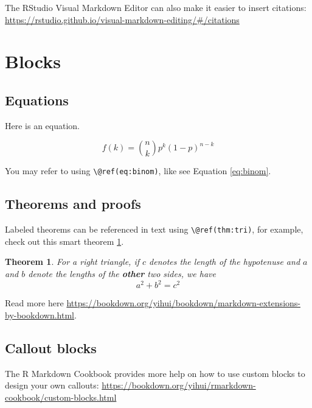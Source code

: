 \documentclass[
]{book}
\newtheorem{theorem}{Theorem}[chapter]
\theoremstyle{definition}
\theoremstyle{definition}
\theoremstyle{definition}
\theoremstyle{definition}
\theoremstyle{remark}
\begin{document}
The RStudio Visual Markdown Editor can also make it easier to insert citations: \url{https://rstudio.github.io/visual-markdown-editing/\#/citations}

\hypertarget{blocks}{%
\section{Blocks}\label{blocks}}

\hypertarget{equations}{%
\subsection{Equations}\label{equations}}

Here is an equation.

\begin{equation} 
  f\left(k\right) = \binom{n}{k} p^k\left(1-p\right)^{n-k}
  \label{eq:binom}
\end{equation}

You may refer to using \texttt{\textbackslash{}@ref(eq:binom)}, like see Equation \eqref{eq:binom}.

\hypertarget{theorems-and-proofs}{%
\subsection{Theorems and proofs}\label{theorems-and-proofs}}

Labeled theorems can be referenced in text using \texttt{\textbackslash{}@ref(thm:tri)}, for example, check out this smart theorem \ref{thm:tri}.

\begin{theorem}
\protect\hypertarget{thm:tri}{}\label{thm:tri}For a right triangle, if \(c\) denotes the \emph{length} of the hypotenuse
and \(a\) and \(b\) denote the lengths of the \textbf{other} two sides, we have
\[a^2 + b^2 = c^2\]
\end{theorem}

Read more here \url{https://bookdown.org/yihui/bookdown/markdown-extensions-by-bookdown.html}.

\hypertarget{callout-blocks}{%
\subsection{Callout blocks}\label{callout-blocks}}

The R Markdown Cookbook provides more help on how to use custom blocks to design your own callouts: \url{https://bookdown.org/yihui/rmarkdown-cookbook/custom-blocks.html}
\end{document}

